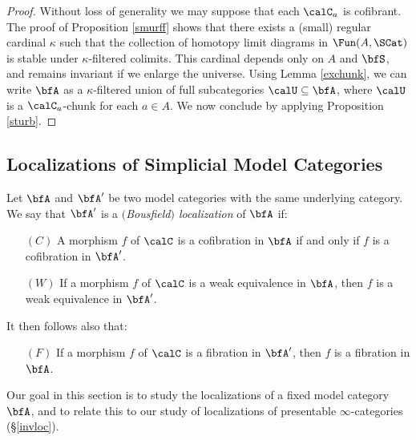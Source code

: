 \begin{proof}
Without loss of generality we may suppose that each $\calC_{a}$ is cofibrant.
The proof of Proposition \ref{smurff} shows that there exists a (small) regular cardinal $\kappa$
such that the collection of homotopy limit diagrams in $\Fun( A, \SCat)$ is stable under
$\kappa$-filtered colimits. This cardinal depends only on $A$ and $\bfS$, and remains invariant if we enlarge the universe. Using Lemma \ref{exchunk}, we can write
$\bfA$ as a $\kappa$-filtered union of full subcategories $\calU \subseteq \bfA$,
where $\calU$ is a $\calC_{a}$-chunk for each $a \in A$. We now conclude by
applying Proposition \ref{sturb}.
\end{proof}

\subsection{Localizations of Simplicial Model Categories}\label{turka}

Let $\bfA$ and $\bfA'$ be two model categories with the same underlying category. We say that $\bfA'$ is a {\it $($Bousfield$)$ localization} of $\bfA$ if:
\begin{itemize}
\item[$(C)$] A morphism $f$ of $\calC$ is a cofibration in $\bfA$ if and only if $f$ is a cofibration in $\bfA'$.
\item[$(W)$] If a morphism $f$ of $\calC$ is a weak equivalence in $\bfA$, then $f$ is a weak equivalence in $\bfA'$.
\end{itemize}
It then follows also that:
\begin{itemize}
\item[$(F)$] If a morphism $f$ of $\calC$ is a fibration in $\bfA'$, then $f$ is a fibration in $\bfA$.
\end{itemize}

Our goal in this section is to study the localizations of a fixed model category $\bfA$, and to relate this to our study of localizations of presentable $\infty$-categories (\S \ref{invloc}). 

